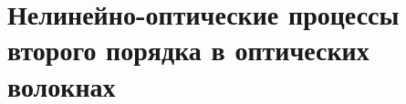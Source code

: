\section{Нелинейно-оптические процессы второго порядка в оптических волокнах}\label{sec:nlin2}









%
%
